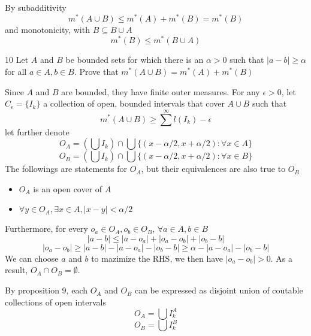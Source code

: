 \begin{solution}
    By subadditivity
    \[m^*(A\cup B ) \leq m^*(A) + m^*(B) = m^*(B)\]
    and monotonicity, with $B\subseteq B\cup A$
    \[m^*(B)\leq m^*(B \cup A)\]
\end{solution}

\begin{exercise} {10}
    Let $A$ and $B$ be bounded sets for which there is an $\alpha>0$ such that $|a-b|\geq \alpha$ for all $a\in A, b\in B$. Prove that $m^*(A\cup B)=m^*(A) + m^*(B)$
\end{exercise}
\begin{solution} 
    Since $A$ and $B$ are bounded, they have finite outer measures. 
    For any $\epsilon>0$, let $C_\epsilon=\{I_k\}$ a collection of open, bounded intervals that cover $A\cup B$ such that
    \[m^*(A\cup B) \geq \sum^\infty l(I_k) - \epsilon\]
    let further denote
    \[O_A = \left(\bigcup I_k\right) \cap \bigcup \{(x-\alpha/2, x+\alpha/2): \forall x \in A\}\]
    \[O_B = \left(\bigcup I_k\right) \cap \bigcup \{(x-\alpha/2, x+\alpha/2): \forall x \in B\}\]
    The followings are statements for $O_A$, but their equivalences are also true to $O_B$
    \begin{itemize}
        \item $O_A$ is an open cover of $A$
        \item $\forall y \in O_A, \exists x \in A, |x-y| < \alpha/2$ 
    \end{itemize}
    Furthermore, for every $o_a\in O_A, o_b\in O_B$, $\forall a\in A, b\in B$
    \[ |a-b| \leq |a-o_a| + |o_a - o_b| + |o_b-b| \]
    \[ |o_a - o_b| \geq |a-b| - |a-o_a| - |o_b-b| \geq \alpha -|a-o_a| - |o_b-b| \]
    We can choose $a$ and $b$ to mazimize the RHS, we then have $|o_a-o_b|>0$. As a result, $O_A \cap O_B = \emptyset$.

    By proposition 9, each $O_A$ and $O_B$ can be expressed as disjoint union of coutable collections of open intervals
    \[O_A = \bigcup I^A_k\]
    \[O_B = \bigcup I^B_k\]


    
\end{solution}  